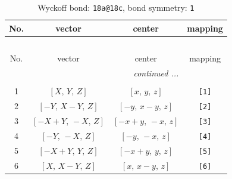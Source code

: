 \documentclass[fleqn,8pt]{jsarticle}
\begin{document}
\begin{longtable}{cccc}
\caption{Wyckoff bond: {\tt 18a@18c}, bond symmetry: {\tt 1}}
 \\
 \hline \hline
No. & vector & center & mapping \\ \hline \endfirsthead

\multicolumn{3}{l}{\tablename\ \thetable{}} \\
 \hline \hline
No. & vector & center & mapping \\ \hline \endhead

 \hline \hline
\multicolumn{3}{r}{\footnotesize\it continued ...} \\ \endfoot

 \hline \hline
\multicolumn{3}{r}{} \\ \endlastfoot

1 & $\left[ X,\, Y,\, Z \right]$ & $\left[ x,\, y,\, z \right]$ & {\tt [1]} \\ \hline
2 & $\left[ - Y,\, X - Y,\, Z \right]$ & $\left[ - y,\, x - y,\, z \right]$ & {\tt [2]} \\ \hline
3 & $\left[ - X + Y,\, - X,\, Z \right]$ & $\left[ - x + y,\, - x,\, z \right]$ & {\tt [3]} \\ \hline
4 & $\left[ - Y,\, - X,\, Z \right]$ & $\left[ - y,\, - x,\, z \right]$ & {\tt [4]} \\ \hline
5 & $\left[ - X + Y,\, Y,\, Z \right]$ & $\left[ - x + y,\, y,\, z \right]$ & {\tt [5]} \\ \hline
6 & $\left[ X,\, X - Y,\, Z \right]$ & $\left[ x,\, x - y,\, z \right]$ & {\tt [6]} \\
\end{longtable}
\end{document}
